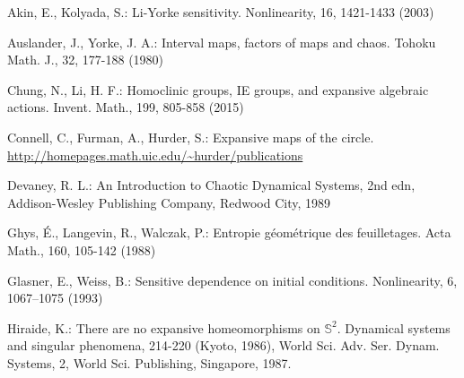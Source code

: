 \documentclass[12pt,a4paper]{amsart}
\theoremstyle{definition}
\numberwithin{equation}{section}
\begin{document}
\begin{thebibliography}{HD}




\normalsize
\baselineskip=17pt

 Akin, E., Kolyada, S.: Li-Yorke sensitivity.
 Nonlinearity,  16, 1421-1433 (2003)

 Auslander, J., Yorke, J. A.: Interval maps, factors of maps and
chaos.  Tohoku Math. J.,  32, 177-188 (1980)



 Chung, N., Li, H. F.: Homoclinic groups, IE groups, and expansive algebraic actions.  Invent. Math.,  199, 805-858 (2015)

 Connell, C., Furman, A., Hurder, S.: Expansive maps of the circle.
\url{http://homepages.math.uic.edu/~hurder/publications}

 Devaney, R. L.: An Introduction to Chaotic Dynamical Systems, 2nd edn,
 Addison-Wesley Publishing Company, Redwood City, 1989

 Ghys, \'{E}., Langevin, R., Walczak, P.: Entropie g\'{e}om\'{e}trique des feuilletages.  {Acta Math.},  {160}, 105-142 (1988)

 Glasner, E., Weiss, B.: Sensitive dependence on initial
conditions.  {Nonlinearity},  {6}, 1067--1075 (1993)

 Hiraide, K.: There are no expansive homeomorphisms on $\mathbb S^2$.  {Dynamical systems and singular phenomena}, 214-220 (Kyoto, 1986), World Sci. Adv. Ser. Dynam. Systems, 2, World Sci. Publishing, Singapore, 1987.




\end{thebibliography}
\end{document}
